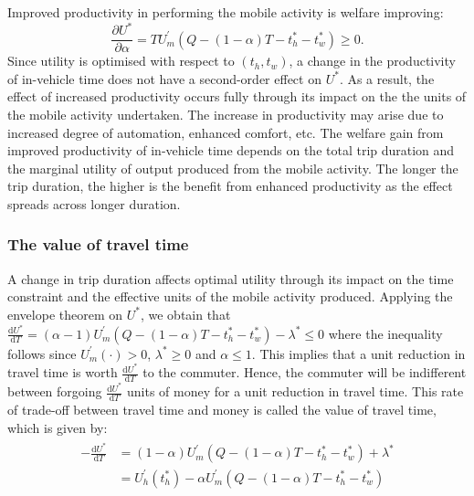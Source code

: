 \documentclass[12pt,a4paper,british]{article}
\begin{document}
Improved productivity in performing the mobile activity is welfare improving:%
\begin{equation*}
    \frac{\partial U^{\ast}}{\partial \alpha} = T U^{\prime}_m\left( Q-\left(1-\alpha\right)T-t_{h}^{\ast}-t_{w}^{\ast} \right) \geq 0.
\end{equation*}
Since utility is optimised with respect to $\left(t_{h},t_{w}\right)$, a change in the productivity of in-vehicle time does not have a second-order effect on $U^{\ast}$. As a result, the effect of increased productivity occurs fully through its impact on the the units of the mobile activity undertaken. The increase in productivity may arise due to increased degree of automation, enhanced comfort, etc. The welfare gain from improved productivity of in-vehicle time depends on the total trip duration and the marginal utility of output produced from the mobile activity. The longer the trip duration, the higher is the benefit from enhanced productivity as the effect spreads across longer duration.


\subsubsection*{The value of travel time}

A change in trip duration affects optimal utility through its impact on the time constraint and the effective units of the mobile activity produced. Applying the envelope theorem on $U^{\ast}$, we obtain that $\frac{\mathrm{d}U^{\ast}}{\mathrm{d}T}=\left(\alpha-1\right)U_{m}^{\prime}\left(Q-\left(1-\alpha\right)T-t_{h}^{\ast}-t_{w}^{\ast}\right)-\lambda^{\ast}\leq0$ where the inequality follows since $U_{m}^{\prime}\left(\cdot\right)>0$, $\lambda^{\ast}\geq0$ and $\alpha\leq1$. This implies that a unit reduction in travel time is worth $\frac{\mathrm{d}U^{\ast}}{\mathrm{d}T}$ to the commuter. Hence, the commuter will be indifferent between forgoing $\frac{\mathrm{d}U^{\ast}}{\mathrm{d}T}$ units of money for a unit reduction in travel time. This rate of trade-off between travel time and money is called the value of travel time, which is given by:%
\begin{align}
\begin{split}
-\frac{\mathrm{d}U^{\ast}}{\mathrm{d}T} & = \left(1 - \alpha\right) U_{m}^{\prime}\left( Q - \left(1 - \alpha\right) T - t_{h}^{\ast} - t_{w}^{\ast}\right) + \lambda^{\ast} \\
& = U_{h}^{\prime}\left( t_{h}^{*} \right) - \alpha U_{m}^{\prime}\left( Q - \left(1 - \alpha\right) T - t_{h}^{\ast} - t_{w}^{\ast} \right)
\end{split}
\label{eq:VOT_det}
\end{align}
\end{document}
